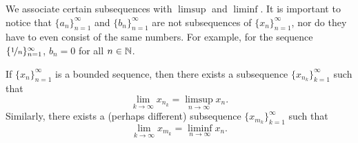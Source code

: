 We associate certain subsequences with $\limsup$ and $\liminf$.
It is important to notice that $\{ a_n \}_{n=1}^\infty$ and
$\{ b_n \}_{n=1}^\infty$ are not
subsequences of $\{ x_n \}_{n=1}^\infty$, nor do they have to even 
consist of the same numbers.
For example, for the sequence $\{ \nicefrac{1}{n} \}_{n=1}^\infty$,
$b_n = 0$ for all $n \in {\mathbb{N}}$.

\begin{thm} \label{subseqlimsupinf:thm}
If $\{ x_n \}_{n=1}^\infty$ is a bounded sequence, then there exists a subsequence
$\{ x_{n_k} \}_{k=1}^\infty$ such that
\begin{equation*}
\lim_{k\to \infty} x_{n_k} = \limsup_{n \to \infty} x_n .
\end{equation*}
Similarly, there exists a (perhaps different) subsequence
$\{ x_{m_k} \}_{k=1}^\infty$ such that
\begin{equation*}
\lim_{k\to \infty} x_{m_k} = \liminf_{n \to \infty} x_n .
\end{equation*}
\end{thm}

